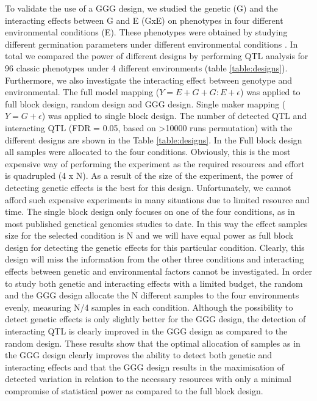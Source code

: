 To validate the use of a GGG design, we studied the genetic (G) and the interacting effects 
between G and E (GxE) on phenotypes in four different environmental conditions (E). These 
phenotypes were obtained by studying different germination parameters under different environmental 
conditions \cite{Joosen:2011}. In total we compared the power of different designs by performing 
QTL analysis for 96 classic phenotypes under 4 different environments \cite{Joosen:2011} (table \ref{table:designs}).  
Furthermore, we also investigate the interacting effect between genotype and environmental. The full model 
mapping ($Y = E + G + G:E + \epsilon$) was applied to full block design, random design and GGG design. 
Single maker mapping ($Y = G + \epsilon$) was applied to single block design. The number of detected QTL and interacting 
QTL (FDR = 0.05, based on >10000 runs permutation) with the different designs are shown in the Table \ref{table:designs}.  
In the Full block design all samples were allocated to the four conditions. Obviously, this is the most expensive way of performing 
the experiment as the required resources and effort is quadrupled (4 x N). As a result of the size of the experiment, 
the power of detecting genetic effects is the best for this design. Unfortunately, we cannot afford such expensive 
experiments in many situations due to limited resource and time. The single block design only focuses on one of the four 
conditions, as in most published genetical genomics studies to date. In this way the effect samples size for the selected 
condition is N and we will have equal power as full block design for detecting the genetic effects for this particular 
condition. Clearly, this design will miss the information from the other three conditions and interacting effects 
between genetic and environmental factors cannot be investigated. In order to study both genetic and interacting 
effects with a limited budget,  the random and the GGG design allocate the N different samples to the four environments 
evenly, measuring N/4 samples in each condition. Although the possibility to detect genetic effects is only slightly better 
for the GGG design, the detection of interacting QTL is clearly improved in the GGG design as compared to the random design. 
These results show that the optimal allocation of samples as in the GGG design clearly improves the ability to detect both 
genetic and interacting effects and that the GGG design results in the maximisation of detected variation in relation to 
the necessary resources with only a minimal compromise of statistical power as compared to the full block design.

